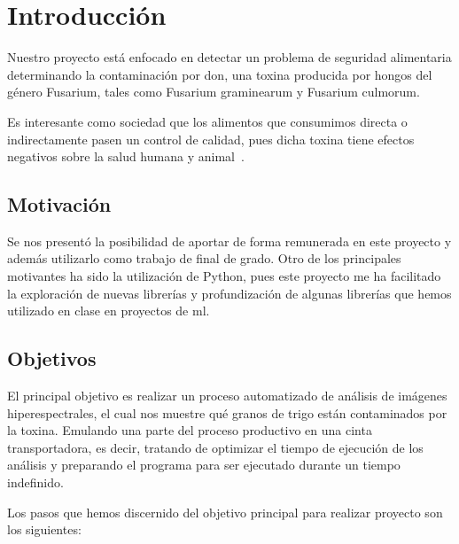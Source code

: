\section{Introducción}

Nuestro proyecto está enfocado en detectar un problema de seguridad alimentaria determinando la contaminación por \acrfull{don}, una toxina producida por hongos del género Fusarium, tales como Fusarium graminearum y Fusarium culmorum. 

Es interesante como sociedad que los alimentos que consumimos directa o indirectamente pasen un control de calidad, pues dicha toxina tiene efectos negativos sobre la salud humana y animal\ \cite{https://doi.org/10.2903/j.efsa.2017.4718}.


\subsection{Motivación}

Se nos presentó la posibilidad de aportar de forma remunerada en este proyecto y además utilizarlo como trabajo de final de grado. Otro de los principales motivantes ha sido la utilización de Python, pues este proyecto me ha facilitado la exploración de nuevas librerías y profundización de algunas librerías que hemos utilizado en clase en proyectos de \gls{ml}.


\subsection{Objetivos}

El principal objetivo es realizar un proceso automatizado de análisis de imágenes hiperespectrales, el cual nos muestre qué granos de trigo están contaminados por la toxina. Emulando una parte del proceso productivo en una cinta transportadora, es decir, tratando de optimizar el tiempo de ejecución de los análisis y preparando el programa para ser ejecutado durante un tiempo indefinido. 

Los pasos que hemos discernido del objetivo principal para realizar proyecto son los siguientes:

